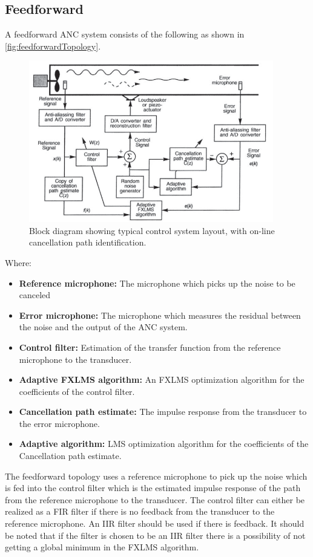 \subsection*{Feedforward}
A feedforward ANC system consists of the following as shown in \autoref{fig:feedforwardTopology}.
\begin{figure}[H]
	\centering
	\includegraphics[width=0.95\textwidth]{figures/BasicSystem/feedforward}
	\caption{Block diagram showing typical control system layout, with on-line cancellation path identification. \cite{Hansen2}}
	\label{fig:feedforwardTopology}
\end{figure}
Where:
\begin{itemize}
\item \textbf{Reference microphone:} The microphone which picks up the noise to be canceled 
\item \textbf{Error microphone:} The microphone which measures the residual between the noise and the output of the ANC system.
\item \textbf{Control filter:} Estimation of the transfer function from the reference microphone to the transducer. 
\item \textbf{Adaptive FXLMS algorithm:} An FXLMS optimization algorithm for the coefficients of the control filter.
\item \textbf{Cancellation path estimate:} The impulse response from the transducer to the error microphone.
\item \textbf{Adaptive algorithm:} LMS optimization algorithm for the coefficients of the Cancellation path estimate.
\end{itemize}

The feedforward topology uses a reference microphone to pick up the noise which is fed into the control filter which is the estimated impulse response of the path from the reference microphone to the transducer. The control filter can either be realized as a FIR filter if there is no feedback from the transducer to the reference microphone. An IIR filter should be used if there is feedback. It should be noted that if the filter is chosen to be an IIR filter there is a possibility of not getting a global minimum in the FXLMS algorithm.


